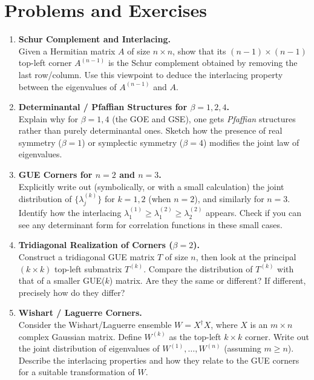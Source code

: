 \documentclass[letterpaper,11pt,oneside,reqno]{article}
\numberwithin{equation}{section}
\theoremstyle{definition}
\begin{document}
\section{Problems and Exercises}
\label{sec:problems}

\begin{enumerate}
\item \textbf{Schur Complement and Interlacing.} \\
Given a Hermitian matrix $A$ of size $n\times n$, show that its $(n-1)\times(n-1)$ top-left corner $A^{(n-1)}$ is the Schur complement obtained by removing the last row/column. Use this viewpoint to deduce the interlacing property between the eigenvalues of $A^{(n-1)}$ and $A$.
\medskip

\item \textbf{Determinantal / Pfaffian Structures for $\beta=1,2,4$.} \\
Explain why for $\beta=1,4$ (the GOE and GSE), one gets \emph{Pfaffian} structures rather than purely determinantal ones. Sketch how the presence of real symmetry ($\beta=1$) or symplectic symmetry ($\beta=4$) modifies the joint law of eigenvalues. 
\medskip

\item \textbf{GUE Corners for $n=2$ and $n=3$.} \\
Explicitly write out (symbolically, or with a small calculation) the joint distribution of $\{\lambda^{(k)}_j\}$ for $k=1,2$ (when $n=2$), and similarly for $n=3$. Identify how the interlacing $\lambda_1^{(1)}\ge \lambda_1^{(2)}\ge \lambda_2^{(2)}$ appears. Check if you can see any determinant form for correlation functions in these small cases.
\medskip

\item \textbf{Tridiagonal Realization of Corners ($\beta=2$).} \\
Construct a tridiagonal GUE matrix $T$ of size $n$, then look at the principal $(k\times k)$ top-left submatrix $T^{(k)}$. Compare the distribution of $T^{(k)}$ with that of a smaller GUE(\!$k$) matrix. Are they the same or different? If different, precisely how do they differ?
\medskip

\item \textbf{Wishart / Laguerre Corners.} \\
Consider the Wishart/Laguerre ensemble $W = X^\dagger X$, where $X$ is an $m\times n$ complex Gaussian matrix. Define $W^{(k)}$ as the top-left $k\times k$ corner. Write out the joint distribution of eigenvalues of $W^{(1)},\dots,W^{(n)}$ (assuming $m\ge n$). Describe the interlacing properties and how they relate to the GUE corners for a suitable transformation of $W$.
\medskip


\end{enumerate}
\end{document}
